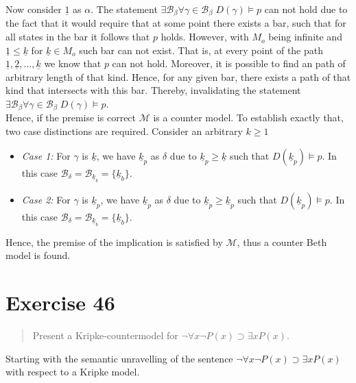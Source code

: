 \documentclass[11pt,a4paper]{article}
\newcommand{\lto}{\supset}
\begin{document}
Now consider $ \underline{1}$ as $\alpha$. The statement $ \exists \mathcal{B}_{\beta}\forall \gamma \in  \mathcal{B}_{\beta} \; D(\gamma) \models p$ can not hold due to the fact that it would require that at some point there exists a bar, such that for all states in the bar it follows that $p$ holds. However, with $M_o$ being infinite and $ \underline{1} \leqslant  \underline{k}$ for $ \underline{k} \in M_o$ such bar can not exist. That is, at every point of the path $ \underline{1}, \underline{2},\dots, \underline{k}$ we know that $p$ can not hold. Moreover, it is possible to find an path of arbitrary length of that kind. Hence, for any given bar, there exists a path of that kind that intersects with this bar. Thereby, invalidating the statement  $\exists \mathcal{B}_{\beta}\forall \gamma \in  \mathcal{B}_{\beta} \; D(\gamma) \models p$. \\

Hence, if the premise is correct $\mathcal{M}$ is a counter model. To establish exactly that, two case distinctions are required.
Consider an arbitrary $k \geqslant 1$
\begin{itemize}
\item \emph{Case 1:} For $\gamma$ is $\underline{k}$, we have $\underline{k}_p$ as $\delta$ due to $\underline{k}_p \geqslant \underline{k}$ such that $D(\underline{k}_p) \models p$. In this case $ \mathcal{B}_{\delta}=  \mathcal{B}_{\underline{k}_b}=\{\underline{k}_b\}$.
\item \emph{Case 2:} For $\gamma$ is $\underline{k}_p$, we have $\underline{k}_p$ as $\delta$ due to $\underline{k}_p \geqslant \underline{k}_p$ such that $D(\underline{k}_p) \models p$. In this case $ \mathcal{B}_{\delta}=  \mathcal{B}_{\underline{k}_b}=\{\underline{k}_b\}$.

\end{itemize}
Hence, the premise of the implication is satisfied by $\mathcal{M}$, thus a counter Beth model is found.


\section*{Exercise 46}
\begin{quote}
Present a Kripke-countermodel for $\neg \forall x \neg P(x) \lto \exists x P(x)$.
\end{quote}



Starting with the semantic unravelling of the sentence $\neg \forall x \neg P(x) \lto \exists x P(x)$ with respect to a Kripke model.
\end{document}
